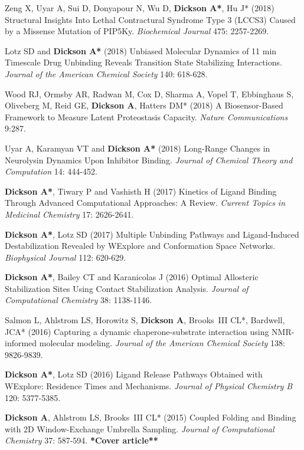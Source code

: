 \documentclass[margin,line]{res}
\begin{document}
\begin{resume}
\begin{spacing}{1.2}
\begin{thebibliography}{10}
  Zeng X, Uyar A, Sui D, Donyapour N, Wu D, {\bf Dickson A*}, Hu J* (2018)
  Structural Insights Into Lethal Contractural Syndrome Type 3 (LCCS3) Caused by a Missense Mutation of PIP5Ky.
  \newblock \textit{Biochemical Journal} 475: 2257-2269.

  Lotz SD and {\bf Dickson A*} (2018)
  Unbiased Molecular Dynamics of 11 min Timescale Drug Unbinding Reveals Transition State Stabilizing Interactions.
\newblock \textit{Journal of the American Chemical Society} 140: 618-628.

  Wood RJ, Ormsby AR, Radwan M, Cox D, Sharma A, Vopel T, Ebbinghaus S, Oliveberg M, Reid GE, {\bf Dickson A}, Hatters DM* (2018)
  A Biosensor-Based Framework to Measure Latent Proteostasis Capacity.
\newblock \textit{Nature Communications} 9:287.

Uyar A, Karamyan VT and {\bf Dickson A*} (2018)
Long-Range Changes in Neurolysin Dynamics Upon Inhibitor Binding.
\newblock \textit{Journal of Chemical Theory and Computation} 14: 444-452.

  {\bf Dickson A*}, Tiwary P and Vashisth H (2017)
Kinetics of Ligand Binding Through Advanced Computational Approaches: A Review.
\newblock \textit{Current Topics in Medicinal Chemistry} 17: 2626-2641.

{\bf Dickson A*}, Lotz SD (2017)
Multiple Unbinding Pathways and Ligand-Induced Destabilization Revealed by WExplore and Conformation Space Networks.
\newblock \textit{Biophysical Journal} 112: 620-629. 

{\bf Dickson A*}, Bailey CT and Karanicolas J (2016)
Optimal Allosteric Stabilization Sites Using Contact Stabilization Analysis.
\newblock \textit{Journal of Computational Chemistry} 38: 1138-1146.

Salmon L, Ahlstrom LS, Horowitz S, {\bf Dickson A}, Brooks~{III} CL*, Bardwell, JCA* (2016)
Capturing a dynamic chaperone-substrate interaction using NMR-informed molecular modeling.
\newblock \textit{Journal of the American Chemical Society} 138: 9826-9839.

{\bf Dickson A*}, Lotz SD (2016)
Ligand Release Pathways Obtained with WExplore: Residence Times and Mechanisms.
\newblock \textit{Journal of Physical Chemistry B} 120: 5377-5385. 

{\bf Dickson A}, Ahlstrom LS, Brooks~{III} CL* (2015)
Coupled Folding and Binding with 2D Window-Exchange Umbrella Sampling.
\newblock \textit{Journal of Computational Chemistry} 37: 587-594. {\bf **Cover article**}


\end{thebibliography}
\end{spacing}
\end{resume}
\end{document}
